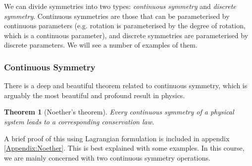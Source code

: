 \documentclass{article}
\theoremstyle{plain}\theoremheaderfont{\normalfont\itshape}\theorembodyfont{\rmfamily}\theoremseparator{.}\newtheorem*{rem}{Remark}\newtheorem*{ex}{Example}\newtheorem*{proof}{Proof}\newtheorem*{altp}{Alternative proof}
\theoremstyle{plain}\theoremheaderfont{\normalfont\bfseries}\theorembodyfont{\rmfamily}\theoremseparator{.}\newtheorem{thm}{Theorem}[section]\newtheorem{lem}[thm]{Lemma}\newtheorem{prop}[thm]{Proposition}\newtheorem*{cor}{Corollary}\newtheorem{defn}[thm]{Definition}\newtheorem{clm}[thm]{Claim}\newtheorem{clminproof}{Claim}\newtheorem*{law}{Law}\newtheorem{pos}[thm]{Postulate}
\theoremstyle{break}\theoremheaderfont{\normalfont\itshape}\theorembodyfont{\rmfamily}\theoremseparator{.\medskip}\newtheorem*{proofskip}{Proof}\newtheorem*{exs}{Examples}\newtheorem*{rems}{Remarks}
\theoremstyle{break}\theoremheaderfont{\normalfont\bfseries}\theorembodyfont{\rmfamily}\theoremseparator{.\medskip}\newtheorem{lemskip}[thm]{Lemma}\newtheorem{defnskip}[thm]{Definition}\newtheorem{propskip}[thm]{Proposition}\newtheorem{thmskip}[thm]{Theorem}
\numberwithin{equation}{section}
\begin{document}
    We can divide symmetries into two types: \textit{continuous symmetry} and \textit{discrete symmetry}. Continuous symmetries are those that can be parameterised by continuous parameters (e.g. rotation is parameterised by the degree of rotation, which is a continuous parameter), and discrete symmetries are parameterised by discrete parameters. We will see a number of examples of them.

    \subsubsection{Continuous Symmetry}
    There is a deep and beautiful theorem related to continuous symmetry, which is arguably the most beautiful and profound result in physics.
    \begin{thm}[Noether's theorem]
        Every continuous symmetry of a physical system leads to a corresponding conservation law.
    \end{thm}
    A brief proof of this using Lagrangian formulation is included in appendix \cref{Appendix:Noether}. This is best explained with some examples. In this course, we are mainly concerned with two continuous symmetry operations.
\end{document}

